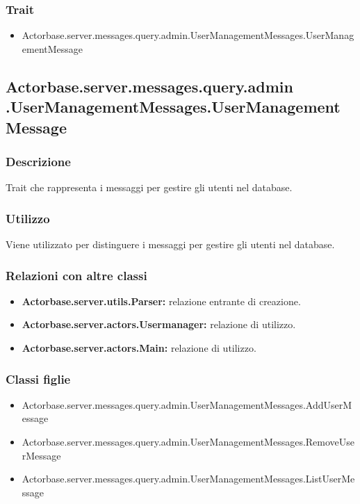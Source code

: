 \documentclass[a4paper]{article}
\begin{document}
			\subsubsection{Trait}
				\begin{itemize}
					\item Actorbase.server.messages.query.admin.UserManagementMessages.UserManagementMessage
				\end{itemize}
				
		\subsection{Actorbase.server.messages.query.admin \newline
		.UserManagementMessages.UserManagementMessage}
			\subsubsection{Descrizione}
				Trait che rappresenta i messaggi per gestire gli utenti nel database.
				
			\subsubsection{Utilizzo}
				Viene utilizzato per distinguere i messaggi per gestire gli utenti nel database.
				
			\subsubsection{Relazioni con altre classi}
				\begin{itemize}
					\item \textbf{Actorbase.server.utils.Parser:} relazione entrante di creazione.
					\item \textbf{Actorbase.server.actors.Usermanager:} relazione di utilizzo.
					\item \textbf{Actorbase.server.actors.Main:} relazione di utilizzo.
				\end{itemize}
			\subsubsection{Classi figlie}
				\begin{itemize}
					\item Actorbase.server.messages.query.admin.UserManagementMessages.AddUserMessage
					\item Actorbase.server.messages.query.admin.UserManagementMessages.RemoveUserMessage
					\item Actorbase.server.messages.query.admin.UserManagementMessages.ListUserMessage
				\end{itemize}
			
\end{document}
